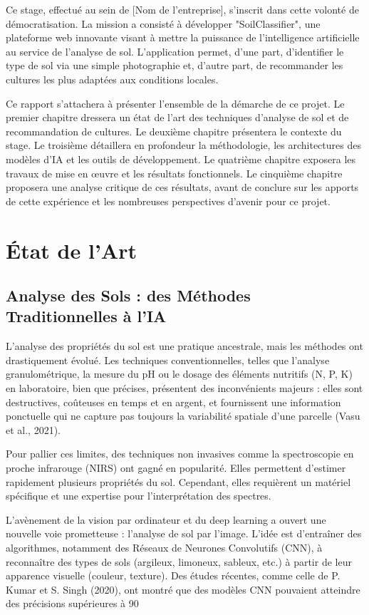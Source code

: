 \documentclass[12pt, a4paper]{report}
\begin{document}
Ce stage, effectué au sein de [Nom de l'entreprise], s'inscrit dans cette volonté de démocratisation. La mission a consisté à développer "SoilClassifier", une plateforme web innovante visant à mettre la puissance de l'intelligence artificielle au service de l'analyse de sol. L'application permet, d'une part, d'identifier le type de sol via une simple photographie et, d'autre part, de recommander les cultures les plus adaptées aux conditions locales.

Ce rapport s'attachera à présenter l'ensemble de la démarche de ce projet. Le premier chapitre dressera un état de l'art des techniques d'analyse de sol et de recommandation de cultures. Le deuxième chapitre présentera le contexte du stage. Le troisième détaillera en profondeur la méthodologie, les architectures des modèles d'IA et les outils de développement. Le quatrième chapitre exposera les travaux de mise en œuvre et les résultats fonctionnels. Le cinquième chapitre proposera une analyse critique de ces résultats, avant de conclure sur les apports de cette expérience et les nombreuses perspectives d'avenir pour ce projet.

\chapter{État de l'Art}
\section{Analyse des Sols : des Méthodes Traditionnelles à l'IA}
L'analyse des propriétés du sol est une pratique ancestrale, mais les méthodes ont drastiquement évolué. Les techniques conventionnelles, telles que l'analyse granulométrique, la mesure du pH ou le dosage des éléments nutritifs (N, P, K) en laboratoire, bien que précises, présentent des inconvénients majeurs : elles sont destructives, coûteuses en temps et en argent, et fournissent une information ponctuelle qui ne capture pas toujours la variabilité spatiale d'une parcelle (Vasu et al., 2021).

Pour pallier ces limites, des techniques non invasives comme la spectroscopie en proche infrarouge (NIRS) ont gagné en popularité. Elles permettent d'estimer rapidement plusieurs propriétés du sol. Cependant, elles requièrent un matériel spécifique et une expertise pour l'interprétation des spectres.

L'avènement de la vision par ordinateur et du deep learning a ouvert une nouvelle voie prometteuse : l'analyse de sol par l'image. L'idée est d'entraîner des algorithmes, notamment des Réseaux de Neurones Convolutifs (CNN), à reconnaître des types de sols (argileux, limoneux, sableux, etc.) à partir de leur apparence visuelle (couleur, texture). Des études récentes, comme celle de P. Kumar et S. Singh (2020), ont montré que des modèles CNN pouvaient atteindre des précisions supérieures à 90%
\end{document}
